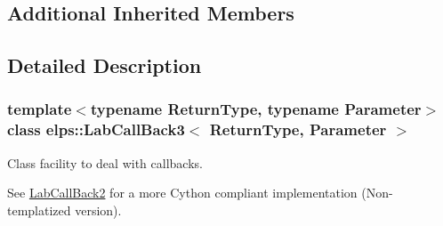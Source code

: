 \subsection*{Additional Inherited Members}


\subsection{Detailed Description}
\subsubsection*{template$<$typename Return\+Type, typename Parameter$>$class elps\+::\+Lab\+Call\+Back3$<$ Return\+Type, Parameter $>$}

Class facility to deal with callbacks.

See \hyperlink{classelps_1_1_lab_call_back2}{Lab\+Call\+Back2} for a more Cython compliant implementation (Non-\/templatized version). 


